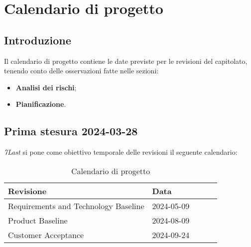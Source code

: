 \section{Calendario di progetto}
\subsection{Introduzione}
Il calendario di progetto contiene le date previste per le revisioni del capitolato, tenendo conto delle osservazioni fatte nelle sezioni:
\begin{itemize}
    \item \textbf{Analisi dei rischi};
    \item \textbf{Pianificazione}.
\end{itemize}

\subsection{Prima stesura 2024-03-28}
\textit{7Last} si pone come obiettivo temporale delle revisioni il seguente calendario:
\begin{table}[!h]
    \begin{center}
        \begin{tabular}{ | l | l | l | l | l | }
            \hline
            Revisione                               & Data       \\ \hline
            Requirements and Technology Baseline    & 2024-05-09 \\
            Product Baseline                        & 2024-08-09 \\
            Customer Acceptance                     & 2024-09-24 \\
            \hline
        \end{tabular}
    \end{center}
    \caption{Calendario di progetto}
    \label{tab:10}
\end{table}

